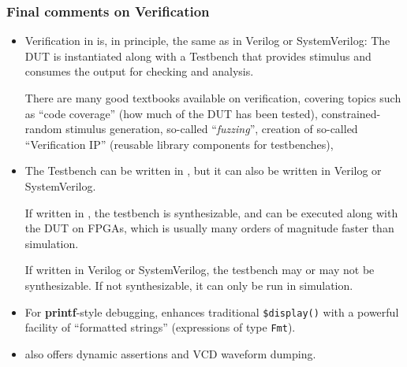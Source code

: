 \begin{frame}[fragile]
\frametitle{Final comments on {\BSV} Verification}

\footnotesize

\begin{itemize}

  \item Verification in {\BSV} is, in principle, the same as in
        Verilog or SystemVerilog: The DUT is instantiated along with a
        Testbench that provides stimulus and consumes the output for
        checking and analysis.

        \vx

        There are many good textbooks available on verification,
        covering topics such as ``code coverage'' (how much of the DUT
        has been tested), constrained-random stimulus generation,
        so-called ``\emph{fuzzing}'', creation of so-called
        ``Verification IP'' (reusable library components for
        testbenches), {\etc}

  \vx
  \item 
        The Testbench can be written in {\BSV}, but it can also be
        written in Verilog or SystemVerilog.

        \vx
        If written in {\BSV}, the testbench is synthesizable, and can
        be executed along with the DUT on FPGAs, which is usually many
        orders of magnitude faster than simulation.

        \vx
        If written in Verilog or SystemVerilog, the testbench may or
        may not be synthesizable.  If not synthesizable, it can only
        be run in simulation.

  \vx

  \item For {\bf printf}-style debugging, {\BSV} enhances traditional
        {\tt \$display()} with a powerful facility of ``formatted
        strings'' (expressions of type {\tt Fmt}).

  \vx
  \item {\BSV} also offers dynamic assertions and VCD waveform dumping.

\end{itemize}

\end{frame}







